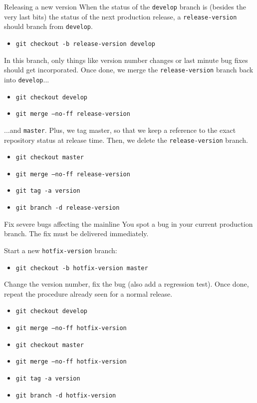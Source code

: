 \documentclass[presentation]{beamer}
\begin{document}
\begin{frame}[fragile]{Releasing a new version}
	When the status of the \texttt{develop} branch is (besides the very last bits) the status of the next production release, a \texttt{release-version} should branch from \texttt{develop}.
	\begin{itemize}
		\item \texttt{git checkout -b release-version develop}
	\end{itemize}
	In this branch, only things like version number changes or last minute bug fixes should get incorporated. Once done, we merge the \texttt{release-version} branch back into \texttt{develop}...
	\begin{itemize}
		\item \texttt{git checkout develop}
		\item \texttt{git merge --no-ff release-version}
	\end{itemize}
	...and \texttt{master}. Plus, we tag master, so that we keep a reference to the exact repository status at release time. Then, we delete the \texttt{release-version} branch.
	\begin{itemize}
		\item \texttt{git checkout master}
		\item \texttt{git merge --no-ff release-version}
		\item \texttt{git tag -a version}
		\item \texttt{git branch -d release-version}
	\end{itemize}
\end{frame}

\begin{frame}[fragile]{Fix severe bugs affecting the mainline}
	You spot a bug in your current production branch. The fix must be delivered immediately.
	
	Start a new \texttt{hotfix-version} branch:
	\begin{itemize}
		\item \texttt{git checkout -b hotfix-version master}
	\end{itemize}
	Change the version number, fix the bug (also add a regression test). Once done, repeat the procedure already seen for a normal release.
	\begin{itemize}
		\item \texttt{git checkout develop}
		\item \texttt{git merge --no-ff hotfix-version}
		\item \texttt{git checkout master}
		\item \texttt{git merge --no-ff hotfix-version}
		\item \texttt{git tag -a version}
		\item \texttt{git branch -d hotfix-version}
	\end{itemize}
\end{frame}
\end{document}
